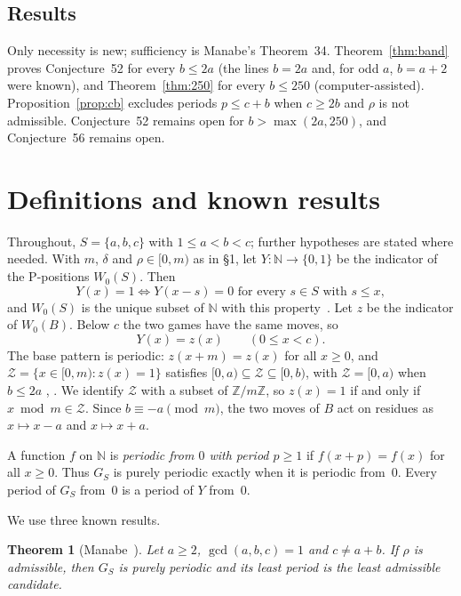 \documentclass[11pt]{amsart}
\newtheorem{theorem}{Theorem}[section]
\theoremstyle{definition}
\numberwithin{equation}{section}
\newcommand{\N}{\mathbb{N}}
\newcommand{\Z}{\mathcal{Z}}
\begin{document}
\subsection{Results}
Only necessity is new; sufficiency is Manabe's Theorem~34. Theorem~\ref{thm:band} proves
Conjecture~52 for every $b\le2a$ (the lines $b=2a$ and, for odd $a$, $b=a+2$ were known), and Theorem~\ref{thm:250}
for every $b\le250$ (computer-assisted). Proposition~\ref{prop:cb} excludes periods
$p\le c+b$ when $c\ge2b$ and $\rho$ is not admissible. Conjecture~52 remains open for $b>\max(2a,250)$, and
Conjecture~56 remains open.

\section{Definitions and known results}

Throughout, $S=\{a,b,c\}$ with $1\le a<b<c$; further hypotheses are stated where needed.
With $m$, $\delta$ and $\rho\in[0,m)$ as in \S1, let $Y\colon\N\to\{0,1\}$ be the indicator of
the P-positions $W_0(S)$. Then
\begin{equation}\label{eq:rec}
Y(x)=1\iff Y(x-s)=0\text{ for every }s\in S\text{ with }s\le x,
\end{equation}
and $W_0(S)$ is the unique subset of $\N$ with this property~\cite[Lemma~4]{Manabe}. Let $z$
be the indicator of $W_0(B)$. Below $c$ the two games have the same moves, so
\begin{equation}\label{eq:below}
Y(x)=z(x)\qquad(0\le x<c).
\end{equation}
The base pattern is periodic: $z(x+m)=z(x)$ for all $x\ge0$, and
$\Z=\{x\in[0,m):z(x)=1\}$ satisfies $[0,a)\subseteq\Z\subseteq[0,b)$, with $\Z=[0,a)$ when
$b\le 2a$ \cite[Prop.~7]{Manabe}, \cite[Thms.~3.3--3.4]{MP}. We identify $\Z$ with a subset
of $\mathbb{Z}/m\mathbb{Z}$, so $z(x)=1$ if and only if $x\bmod m\in\Z$. Since
$b\equiv-a\pmod m$, the two moves of $B$ act on residues as $x\mapsto x-a$ and
$x\mapsto x+a$.

A function $f$ on $\N$ is \emph{periodic from $0$ with period $p\ge1$} if $f(x+p)=f(x)$ for
all $x\ge0$. Thus $G_S$ is purely periodic exactly when it is periodic from~$0$. Every period
of $G_S$ from~$0$ is a period of $Y$ from~$0$.

We use three known results.

\begin{theorem}[{Manabe~\cite[Thm.~34]{Manabe}}]\label{thm:34}
Let $a\ge2$, $\gcd(a,b,c)=1$ and $c\ne a+b$. If $\rho$ is admissible, then $G_S$ is purely
periodic and its least period is the least admissible candidate.
\end{theorem}
\end{document}
